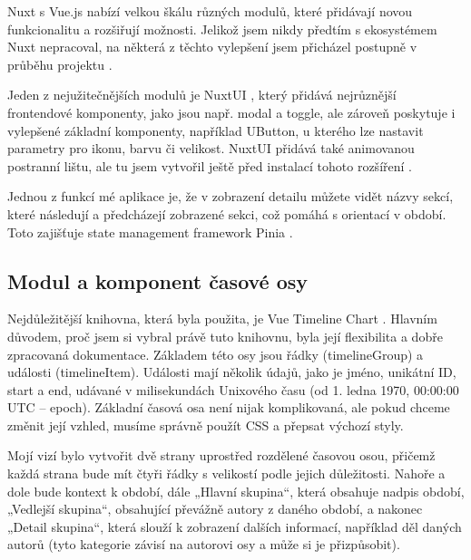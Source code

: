 Nuxt s Vue.js nabízí velkou škálu různých modulů, které přidávají novou funkcionalitu a rozšiřují možnosti. Jelikož jsem nikdy předtím s ekosystémem Nuxt nepracoval, na některá z těchto vylepšení jsem přicházel postupně v průběhu projektu \cite{libraries-on-EVERY-project, Nuxt3-Crash-Course}.

Jeden z nejužitečnějších modulů je NuxtUI \cite{NUXT-UI}, který přidává nejrůznější frontendové komponenty, jako jsou např. modal a toggle, ale zároveň poskytuje i vylepšené základní komponenty, například UButton, u kterého lze nastavit parametry pro ikonu, barvu či velikost. NuxtUI přidává také animovanou postranní lištu, ale tu jsem vytvořil ještě před instalací tohoto rozšíření \cite{sidebar}.

Jednou z funkcí mé aplikace je, že v zobrazení detailu můžete vidět názvy sekcí, které následují a předcházejí zobrazené sekci, což pomáhá s orientací v období. Toto zajišťuje state management framework Pinia \cite{Pinia-store}.

\subsection{Modul a komponent časové osy} \label{Komponent časové osy}

Nejdůležitější knihovna, která byla použita, je Vue Timeline Chart \cite{Vue-timeline-chart}. Hlavním důvodem, proč jsem si vybral právě tuto knihovnu, byla její flexibilita a dobře zpracovaná dokumentace. Základem této osy jsou řádky (timelineGroup) a události (timelineItem). Události mají několik údajů, jako je jméno, unikátní ID, start a end, udávané v milisekundách Unixového času (od 1. ledna 1970, 00:00:00 UTC – epoch). Základní časová osa není nijak komplikovaná, ale pokud chceme změnit její vzhled, musíme správně použít CSS a přepsat výchozí styly.

Mojí vizí bylo vytvořit dvě strany uprostřed rozdělené časovou osou, přičemž každá strana bude mít čtyři řádky s velikostí podle jejich důležitosti. Nahoře a dole bude kontext k období, dále „Hlavní skupina“, která obsahuje nadpis období, „Vedlejší skupina“, obsahující převážně autory z daného období, a nakonec „Detail skupina“, která slouží k zobrazení dalších informací, například děl daných autorů (tyto kategorie závisí na autorovi osy a může si je přizpůsobit).

\newpage

